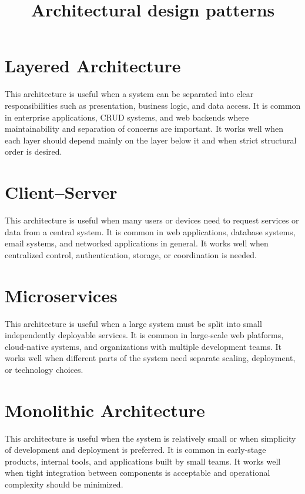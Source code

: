 \documentclass[a4paper]{article}
\title{Architectural design patterns}
\date{}
\begin{document}
    \maketitle
    
    
    \section{Layered Architecture}
        This architecture is useful when a system can be separated into clear responsibilities such as presentation, business logic, and data access.
        It is common in enterprise applications, CRUD systems, and web backends where maintainability and separation of concerns are important.
        It works well when each layer should depend mainly on the layer below it and when strict structural order is desired.
    
    
    \section{Client--Server}
        This architecture is useful when many users or devices need to request services or data from a central system.
        It is common in web applications, database systems, email systems, and networked applications in general.
        It works well when centralized control, authentication, storage, or coordination is needed.
    
    
    \section{Microservices}
        This architecture is useful when a large system must be split into small independently deployable services.
        It is common in large-scale web platforms, cloud-native systems, and organizations with multiple development teams.
        It works well when different parts of the system need separate scaling, deployment, or technology choices.
    
    
    \section{Monolithic Architecture}
        This architecture is useful when the system is relatively small or when simplicity of development and deployment is preferred.
        It is common in early-stage products, internal tools, and applications built by small teams.
        It works well when tight integration between components is acceptable and operational complexity should be minimized.
    
\end{document}
